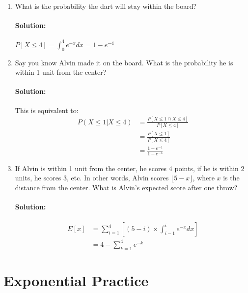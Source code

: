 \documentclass[11pt, notitlepage]{article}
\newcommand{\Question}[1]{\newpage\section{#1}}
\newenvironment{solution}{\paragraph{Solution:}}{\hfill \vspace{10mm}}
\begin{document}
\begin{enumerate}[label=\alph*.)]
        \item What is the probability the dart will stay within the board?
		\begin{solution} $P[X\leq 4] = \int_{0}^{4}{e^{-x}dx}= 1-e^{-4}$ 
		\end{solution}
        \item Say you know Alvin made it on the board. What is the probability he is within 1 unit from the center?
		\begin{solution}
			This is equivalent to: $$\begin{aligned}P(X\leq 1 | X \leq 4)&=\frac{P[X\leq 1 \cap X\leq 4]}{P[X \leq 4]}\\
			&=\frac{P[X\leq 1]}{P[X \leq 4]}\\
			&=\frac{1-e^{-1}}{1-e^{-4}}
			\end{aligned} $$
		\end{solution}
        \item If Alvin is within 1 unit from the center, he scores 4 points, if he is within 2 units, he scores 3, etc. In other words, Alvin scores $\lfloor 5 - x\rfloor$, where $x$ is the distance from the center.  What is Alvin's expected score after one throw?
        \begin{solution}
        	$$\begin{aligned}E[x]&=\sum_{i=1}^{4}{\left[(5-i)\times \int_{i-1}^{i}{e^{-x}dx}\right]}\\
        	&= 4-\sum_{k=1}^{4}{e^{-k}}
        	\end{aligned}$$
        \end{solution}
\end{enumerate}
\Question{Exponential Practice}
\end{document}
